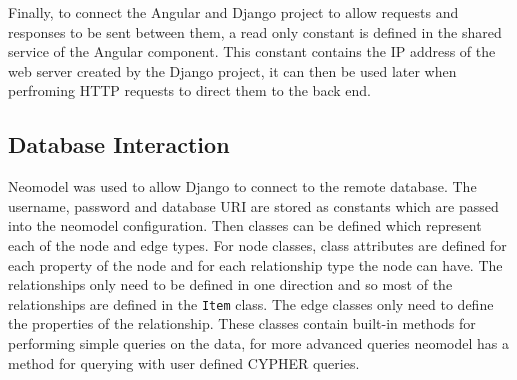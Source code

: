 Finally, to connect the Angular and Django project to allow requests and responses to be sent between them, a read only constant is defined 
in the shared service of the Angular component. This constant contains the IP address of the web server created by the Django project, it can then 
be used later when perfroming HTTP requests to direct them to the back end.
\subsection{Database Interaction}
Neomodel was used to allow Django to connect to the remote database. The username, password and database URI are stored as 
constants which are passed into the neomodel configuration. Then classes can be defined which represent each of the node and edge types.
For node classes, class attributes are defined for each property of the node and for each relationship type the node can have. The relationships 
only need to be defined in one direction and so most of the relationships are defined in the \verb|Item| class. The edge classes only need to 
define the properties of the relationship. These classes contain built-in methods for performing simple queries on the data, for more 
advanced queries neomodel has a method for querying with user defined CYPHER queries.
